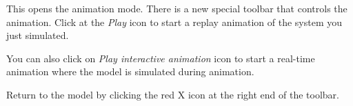 \documentclass[a4paper,pdftex]{article}
\begin{document}
\begin{tutenumerate}
This opens the animation mode.
There is a new special toolbar that controls the animation.
Click at the \textit{Play} icon to start a replay animation of the system you just simulated. 


You can also click on \textit{Play interactive animation} icon to start a real-time animation where the model is simulated during animation.


Return to the model by clicking the red X icon at the right end of the toolbar.
\end{tutenumerate}
\end{document}
